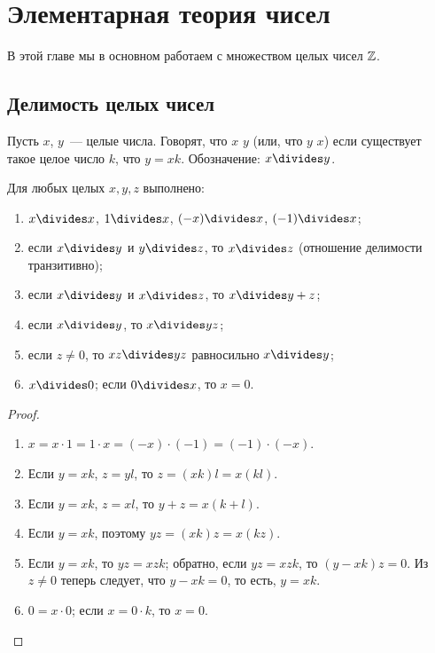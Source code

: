 \section{Элементарная теория чисел}

В этой главе мы в основном работаем с множеством целых чисел $\mathbb Z$.

\subsection{Делимость целых чисел}\label{subsect_divide}


\begin{definition}
Пусть $x$, $y$~--- целые числа. Говорят, что
$x$  $y$
(или, что $y$  $x$) если
существует такое целое число $k$, что $y=xk$. Обозначение:
$x\divides y$.
\end{definition}

\begin{proposition}
Для любых целых $x,y,z$ выполнено:
\begin{enumerate}
\item $x\divides x$, $1\divides x$, $(-x)\divides x$,
  $(-1)\divides x$;
\item если $x\divides y$ и $y\divides z$, то $x\divides z$ (отношение
  делимости транзитивно);
\item если $x\divides y$ и $x\divides z$, то $x\divides y+z$;
\item если $x\divides y$, то $x\divides yz$;
\item если $z\neq 0$, то $xz\divides yz$ равносильно $x\divides y$;
\item $x\divides 0$;  если $0\divides x$, то $x=0$.
\end{enumerate}
\end{proposition}
\begin{proof}
\begin{enumerate}
\item $x=x\cdot 1=1\cdot x=(-x)\cdot(-1)=(-1)\cdot(-x)$.
\item Если $y=xk$, $z=yl$, то $z = (xk)l = x(kl)$.
\item Если $y=xk$, $z=xl$, то $y+z=x(k+l)$.
\item Если $y=xk$, поэтому $yz=(xk)z = x(kz)$.
\item Если $y=xk$, то $yz=xzk$; обратно, если $yz=xzk$, то
  $(y-xk)z=0$. Из $z\neq 0$ теперь следует, что $y-xk=0$, то есть,
  $y=xk$.
\item $0=x\cdot 0$; если $x=0\cdot k$, то $x=0$.
\end{enumerate}
\end{proof}

